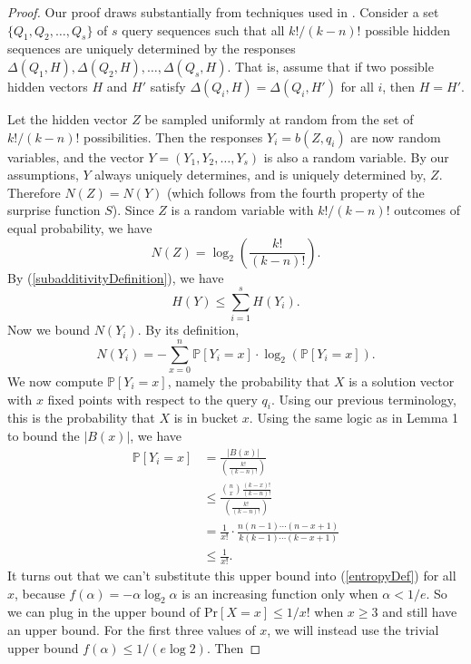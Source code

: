 \documentclass[12pt, a4paper]{article}
\begin{document}

\begin{proof}
	Our proof draws substantially from techniques used in \cite{DS13}. Consider a set $\{Q_1, Q_2, \ldots, Q_s\}$ of $s$ query sequences such that all $k!/(k-n)!$ possible hidden sequences are uniquely determined by the responses $\Delta(Q_1, H), \Delta(Q_2, H), \ldots, \Delta(Q_s, H)$. That is, assume that if two possible hidden vectors $H$ and $H'$ satisfy $\Delta(Q_i, H) = \Delta(Q_i, H')$ for all $i$, then $H = H'$.

	Let the hidden vector $Z$ be sampled uniformly at random from the set of $k!/(k-n)!$ possibilities. Then the responses $Y_i = b(Z, q_i)$ are now random variables, and the vector $Y = (Y_1, Y_2, \ldots, Y_s)$ is also a random variable. By our assumptions, $Y$ always uniquely determines, and is uniquely determined by, $Z$. Therefore $N(Z) = N(Y)$ (which follows from the fourth property of the surprise function $S$). Since $Z$ is a random variable with $k!/(k-n)!$ outcomes of equal probability, we have
	\begin{equation}\label{equalEntropy}
		N(Z) = \log_2\left(\frac{k!}{(k-n)!}\right).
	\end{equation}
	By (\ref{subadditivityDefinition}), we have
	\begin{equation}\label{entropySum}
		H(Y)\le\sum_{i=1}^s H(Y_i).
	\end{equation}
	Now we bound $N(Y_i)$. By its definition,
	\begin{equation}\label{entropyDef}
		N(Y_i)=-\sum_{x=0}^n \mathbb{P}[Y_i=x]\cdot\log_2(\mathbb{P}[Y_{i}=x]).
	\end{equation}
	We now compute $\mathbb{P}[Y_i=x]$, namely the probability that $X$ is a solution vector with $x$ fixed points with respect to the query $q_i$. Using our previous terminology, this is the probability that $X$ is in bucket $x$.
	Using the same logic as in Lemma 1 to bound the $|B(x)|$, we have
	\begin{align*}
		\mathbb{P}[Y_i = x] &= \frac{|B(x)|}{\left(\frac{k!}{(k-n)!}\right)}\\
		&\leq \frac{\binom{n}{x}\frac{(k-x)!}{(k-n)!}}{\left(\frac{k!}{(k-n)!}\right)}\\
		&= \frac{1}{x!}\cdot\frac{n(n-1)\cdots(n-x+1)}{k(k-1)\cdots(k-x+1)}\\
		&\leq \frac{1}{x!}.
	\end{align*}
	It turns out that we can't substitute this upper bound into  (\ref{entropyDef}) for all $x$, because $f(\alpha)=-\alpha\log_2\alpha$ is an increasing function only when $\alpha<1/e$. So we can plug in the upper bound of $\text{Pr}[X=x]\le 1/x!$ when $x\ge 3$ and still have an upper bound. For the first three values of $x$, we will instead use the trivial upper bound $f(\alpha)\le 1/(e\log 2)$. Then

\end{proof}
\end{document}
